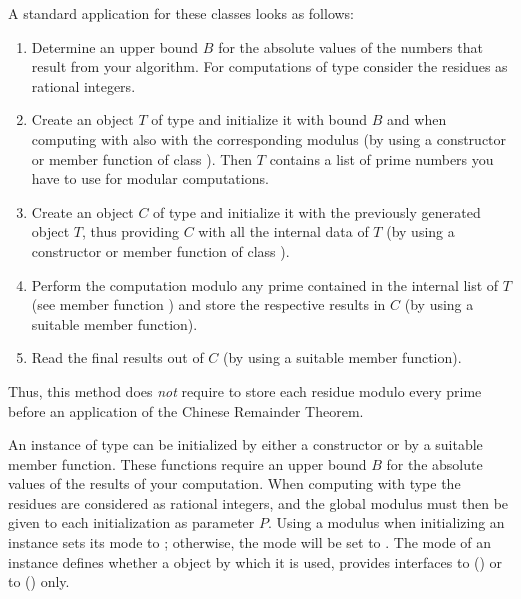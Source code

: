A standard application for these classes looks as follows:

\begin{enumerate}
  
\item Determine an upper bound $B$ for the absolute values of the numbers that result from your
  algorithm.  For computations of type  consider the residues as rational integers.
  
\item Create an object $T$ of type  and initialize it with bound $B$ and when
  computing with  also with the corresponding modulus (by using a constructor or
   member function of class ).  Then $T$ contains a list of prime
  numbers you have to use for modular computations.
  
\item Create an object $C$ of type  and initialize it with the previously generated
  object $T$, thus providing $C$ with all the internal data of $T$ (by using a constructor or
   member function of class ).
  
\item Perform the computation modulo any prime contained in the internal list of $T$ (see member
  function ) and store the respective results in $C$ (by using a suitable
   member function).
  
\item Read the final results out of $C$ (by using a suitable  member
  function).

\end{enumerate}

Thus, this method does \emph{not} require to store each residue modulo every prime before an
application of the Chinese Remainder Theorem.




An instance of type  can be initialized by either a constructor or by a suitable
 member function.  These functions require an upper bound $B$ for the absolute
values of the results of your computation.  When computing with type  the residues
are considered as rational integers, and the global modulus must then be given to each
initialization as parameter $P$.  Using a modulus when initializing an instance sets its mode to
; otherwise, the mode will be set to .  The mode of an instance
defines whether a  object by which it is used, provides interfaces to 
() or to  () only.

